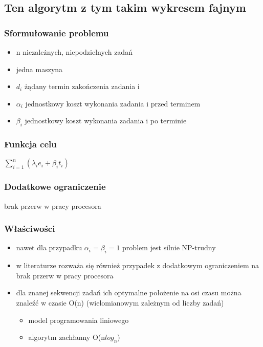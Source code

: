 \documentclass[12pt,a4paper]{article}
\begin{document}
\subsection{Ten algorytm z tym takim wykresem fajnym}
\subsubsection{Sformułowanie problemu}
\begin{itemize}
\item n niezależnych, niepodzielnych zadań
\item jedna maszyna
\item $d_{i}$ żądany termin zakończenia zadania i
\item $\alpha_{i}$ jednostkowy koszt wykonania zadania i przed terminem
\item $\beta_{i}$ jednostkowy koszt wykonania zadania i po terminie
\end{itemize}
\subsubsection{Funkcja celu}
$\sum\limits_{i=1}^{n}(\lambda_{i}e_{i}+\beta_{i}t_{i})$
\subsubsection{Dodatkowe ograniczenie}
brak przerw w pracy procesora
\subsubsection{Właściwości}
\begin{itemize}
\item nawet dla przypadku $\alpha_{i}=\beta_{i}=1$ problem jest silnie NP-trudny
\item w literaturze rozważa się również przypadek z dodatkowym ograniczeniem na brak przerw w pracy procesora
\item dla znanej sekwencji zadań ich optymalne położenie na osi czasu można znaleźć w czasie O(n) (wielomianowym zależnym od liczby zadań)\begin{itemize}
\item model programowania liniowego
\item algorytm zachłanny O(n$log_{n}$)
\end{itemize}
\end{itemize}
\end{document}

